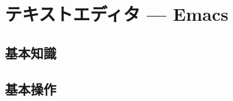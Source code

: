 \documentclass[main]{subfiles}
\begin{document}
\chapter{テキストエディタ --- Emacs}
\section{基本知識}
\section{基本操作}
\fontsize{10.2}{10} \selectfont
\end{document}
